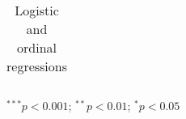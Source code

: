 \begin{table}
\begin{center}
\begin{threeparttable}
\begin{tabular}{l c c c c c c c c c c c c c c c}
\bottomrule
\end{tabular}
\begin{tablenotes}[flushleft]
\scriptsize{\item $^{***}p<0.001$; $^{**}p<0.01$; $^{*}p<0.05$}
\end{tablenotes}
\end{threeparttable}
\caption{Logistic and ordinal regressions}
\label{table:coefficients}
\end{center}
\end{table}
